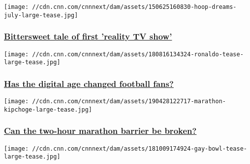 \href{/2019/05/04/sport/hoop-dreams-25th-anniversary-spt-intl/index.html}{}

\texttt{[image: //cdn.cnn.com/cnnnext/dam/assets/150625160830-hoop-dreams-july-large-tease.jpg]}

\hypertarget{bittersweet-tale-of-first-reality-tv-show}{%
\subsubsection{\texorpdfstring{\href{/2019/05/04/sport/hoop-dreams-25th-anniversary-spt-intl/index.html}{Bittersweet
tale of first 'reality TV
show'}}{Bittersweet tale of first 'reality TV show'}}\label{bittersweet-tale-of-first-reality-tv-show}}

\href{/2018/08/17/football/cristiano-ronaldo-juventus-social-media-fans-china-spt-intl/index.html}{}

\texttt{[image: //cdn.cnn.com/cnnnext/dam/assets/180816134324-ronaldo-tease-large-tease.jpg]}

\hypertarget{has-the-digital-age-changed-football-fans}{%
\subsubsection{\texorpdfstring{\href{/2018/08/17/football/cristiano-ronaldo-juventus-social-media-fans-china-spt-intl/index.html}{Has
the digital age changed football
fans?}}{Has the digital age changed football fans?}}\label{has-the-digital-age-changed-football-fans}}

\href{/2019/05/06/sport/eliud-kipchoge-london-marathon-break-two-hour-barrier-spt-intl/index.html}{}

\texttt{[image: //cdn.cnn.com/cnnnext/dam/assets/190428122717-marathon-kipchoge-large-tease.jpg]}

\hypertarget{can-the-two-hour-marathon-barrier-be-broken}{%
\subsubsection{\texorpdfstring{\href{/2019/05/06/sport/eliud-kipchoge-london-marathon-break-two-hour-barrier-spt-intl/index.html}{Can
the two-hour marathon barrier be
broken?}}{Can the two-hour marathon barrier be broken?}}\label{can-the-two-hour-marathon-barrier-be-broken}}

\href{/2018/10/17/sport/gay-bowl-xviii-nfl-denver-broncos-intl-spt/index.html}{}

\texttt{[image: //cdn.cnn.com/cnnnext/dam/assets/181009174924-gay-bowl-tease-large-tease.jpg]}


